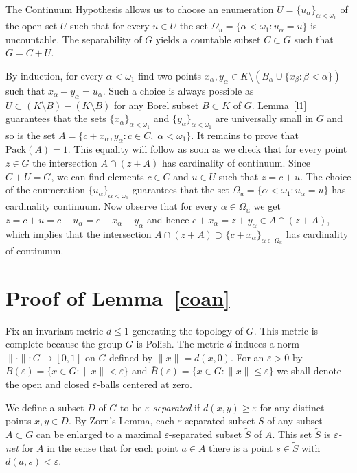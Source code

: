 \documentclass[11pt]{amsart}
\begin{document}
The Continuum Hypothesis allows us to choose an enumeration $U=\{u_\alpha\}_{\alpha<\omega_1}$ of the open set $U$ such that for every $u\in U$ the set $\Omega_u=\{\alpha<{\omega}_1: u_\alpha=u\}$ is uncountable. The separability of $G$ yields a countable subset $C\subset G$ such that $G=C+U$.

By induction, for every $\alpha<{\omega}_1$ find two points $x_\alpha,y_\alpha\in K\setminus (B_\alpha\cup\{x_\beta:\beta<\alpha\})$ such that $x_\alpha-y_\alpha=u_\alpha$. Such a choice is always possible as $U\subset (K\setminus B)-(K\setminus B)$ for any Borel subset $B\subset K$ of  $G$. Lemma~\ref{l1} guarantees that the sets $\{x_\alpha\}_{\alpha<{\omega}_1}$ and $\{y_\alpha\}_{\alpha<{\omega}_1}$ are universally small in $G$ and so is the set $A=\{c+x_\alpha,y_\alpha:c\in C,\;\alpha<{\omega}_1\}$. It remains to prove that ${\mathrm{Pack}}(A)=1$. This equality will follow as soon as we check that for every point $z\in G$ the intersection $A\cap (z+A)$ has cardinality of continuum. Since $C+U=G$, we can find elements $c\in C$ and $u\in U$ such that $z=c+u$. The choice of the enumeration $\{u_\alpha\}_{\alpha<{\omega}_1}$  guarantees that the set $\Omega_u=\{\alpha<{\omega}_1:u_\alpha=u\}$ has cardinality continuum. Now observe that for every $\alpha\in \Omega_u$ we get $z=c+u=c+u_\alpha=c+x_\alpha-y_\alpha$ and hence $c+x_\alpha=z+y_\alpha\in A\cap (z+A)$, which implies that the intersection $A\cap (z+A)\supset\{c+x_\alpha\}_{\alpha\in \Omega_u}$ has cardinality of continuum.

\section{Proof of Lemma~\ref{coan}}\label{pf:l}
 Fix an invariant metric $d\le 1$ generating the topology of $G$.
This metric is complete because the group $G$ is Polish. The  metric $d$ induces a norm $\|\cdot\|:G\to[0,1]$ on $G$ defined by $\|x\|=d(x,0)$. For an ${\varepsilon}>0$ by $B({\varepsilon})=\{x\in G:\|x\|<{\varepsilon}\}$ and $\bar B({\varepsilon})=\{x\in G:\|x\|\le{\varepsilon}\}$ we shall denote the open and closed ${\varepsilon}$-balls centered at zero.

We define a subset $D$ of $G$ to be {\em $\varepsilon$-separated}
if $d(x,y)\ge\varepsilon$ for any distinct points $x,y\in D$.
By Zorn's Lemma, each ${\varepsilon}$-separated subset $S$ of any subset $A\subset G$ can be enlarged to a
maximal ${\varepsilon}$-separated subset $\tilde S$ of $A$. This set $\tilde S$ is {\em ${\varepsilon}$-net} for $A$ in the sense that for each point $a\in A$ there is a point $s\in \tilde S$ with $d(a,s)<{\varepsilon}$.
\end{document}
